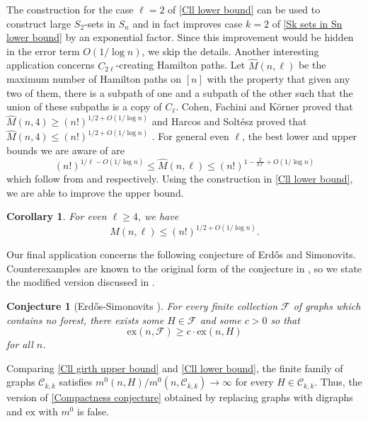 \documentclass[12pt]{article}
\newtheorem{cor}{Corollary}
\newtheorem{conj}{Conjecture}
\def\john#1{\noindent
\textcolor{green}
{\textsc{(John:}
\textsf{#1})}}
\begin{document}
The construction for the case $\ell=2$ of \autoref{Cll lower bound} can be used to construct large $S_2$-sets in $S_n$ and in fact improves case $k=2$ of \autoref{Sk sets in Sn lower bound} by an exponential factor. Since this improvement would be hidden in the error term $O(1/\log n)$, we skip the details. Another interesting application concerns $C_{2\ell}$-creating Hamilton paths. Let $\hat{M}(n,\ell)$ be the maximum number of Hamilton paths on $[n]$ with the property that given any two of them, there is a subpath of one and a subpath of the other such that the union of these subpaths is a copy of $C_\ell$. %
Cohen, Fachini and K\"orner \cite{cohen2017path} proved that $\hat{M}(n,4)\geq (n!)^{1/2+O(1/\log n)}$ and Harcos and Solt\'esz \cite{HS} proved that $\hat{M}(n,4)\leq (n!)^{1/2+O(1/\log n)}$ . For general even $\ell$, the best lower and upper bounds we are aware of are $$(n!)^{1/\ell-O(1/\log n)}\le\hat M(n,\ell)\le(n!)^{1-\frac{2}{3\ell}+O(1/\log n)}$$ 
which follow from \cite{soltesz2020even} and \cite{byrne2024improved} respectively. Using the construction in \autoref{Cll lower bound}, we are able to improve the upper bound.

\begin{cor} \label{Path separation application}
For even $\ell\ge 4$, we have
$$\hat M(n,\ell)\le(n!)^{1/2+O(1/\log n)}.$$
\end{cor}

Our final application concerns the following conjecture of Erd\H{o}s and Simonovits. Counterexamples are known to the original form of the conjecture in \cite{erdHos1982compactness}, so we state the modified version discussed in \cite{wigdersonerdos}.

\begin{conj}[Erd\H{o}s-Simonovits \cite{erdHos1982compactness}] \label{Compactness conjecture}
    For every finite collection $\mathcal F$ of graphs which contains no forest, there exists some $H\in\mathcal F$ and some $c>0$ so that
    $$\mathrm{ex}(n,\mathcal F)\ge c\cdot\mathrm{ex}(n,H)$$
    for all $n$.
\end{conj}

Comparing \autoref{Cll girth upper bound} and \autoref{Cll lower bound}, the finite family of graphs $\mathcal C_{k,k}$ satisfies $m^0(n,H)/m^0(n,\mathcal C_{k,k})\to\infty$ for every $H\in\mathcal C_{k,k}$. Thus, the version of \autoref{Compactness conjecture} obtained by replacing graphs with digraphs and $\mathrm{ex}$ with $m^0$ is false.
\end{document}
